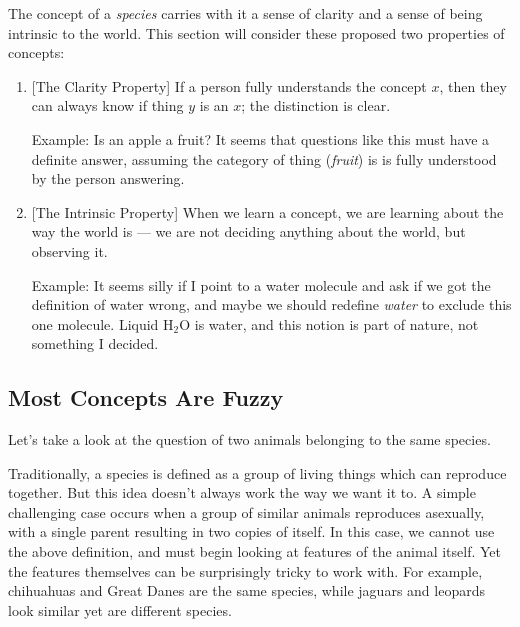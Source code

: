\documentclass[11pt, oneside]{article}   	%
\begin{document}
The concept of a {\em species} carries with it a sense of clarity and a
sense of being intrinsic to the world.
This section will consider
these proposed two properties of concepts:
\begin{enumerate}
    \item{} [The Clarity Property]
        If a person fully understands the concept $x$,
        then they can always know if thing $y$ is an $x$;
        the distinction is clear.

        Example: Is an apple a fruit? It seems that questions like this must
        have a definite answer, assuming the category of thing ({\em fruit}) is
        is fully understood by the person answering.
    \item{} [The Intrinsic Property]
        When we learn a concept, we are learning about the way the world
        is --- we are not deciding anything about the world, but observing it.

        Example: It seems silly if I point to a water molecule and ask if we got
        the definition of water wrong, and maybe we should redefine {\em water}
        to exclude this one molecule.
        Liquid H$_2$O is water, and this notion is part
        of nature, not something I decided.
\end{enumerate}


\subsection{Most Concepts Are Fuzzy}

Let's take a look at the question of two animals belonging to the
same species.

Traditionally, a species is defined as a group of living things
which can reproduce together. But this idea doesn't always work the way we want
it to. A simple challenging case occurs when a group of similar animals
reproduces asexually, with a single parent resulting in two copies of itself. In
this case, we cannot use the above definition, and must begin looking at
features of the animal itself. Yet the features themselves can be surprisingly
tricky to work with. For example, chihuahuas and Great Danes are the same
species, while jaguars and leopards look similar yet are different species.
\end{document}
